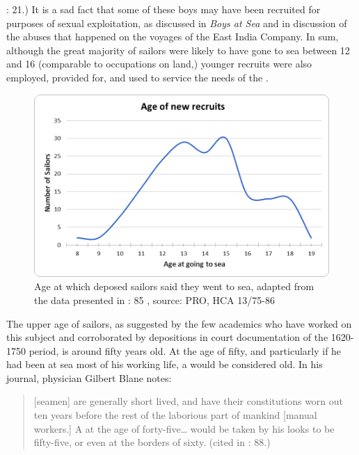 \citealt{AdkinsAdkins2008}: 21.) It is a sad fact that some of these boys may have been recruited for purposes of sexual exploitation, as discussed in  \textit{Boys at Sea} and in  discussion of the abuses that happened on the voyages of the East India Company. In sum, although the great majority of sailors were likely to have gone to sea between 12 and 16 (comparable to occupations on land,) younger recruits were also employed, provided for, and used to service the needs of the .


\begin{figure}

\caption{\label{fig:key:3.1}Age at which deposed sailors said they went to sea, adapted from the data presented in \citealt{Earle1998}: 85 , source: PRO, HCA 13/75-86}
\includegraphics[width=\textwidth]{figures/delgado-img2.png}
\end{figure}

The upper age of sailors, as suggested by the few academics who have worked on this subject and corroborated by depositions in court documentation of the 1620-1750 period, is around fifty years old. At the age of fifty, and particularly if he had been at sea most of his working life, a  would be considered old.  In his journal, physician Gilbert Blane notes:

\begin{quotation}
[seamen] are generally short lived, and have their constitutions worn out ten years before the rest of the laborious part of mankind [manual workers.] A  at the age of forty-five… would be taken by his looks to be fifty-five, or even at the borders of sixty. (cited in \citealt{AdkinsAdkins2008}: 88.) \end{quotation}

